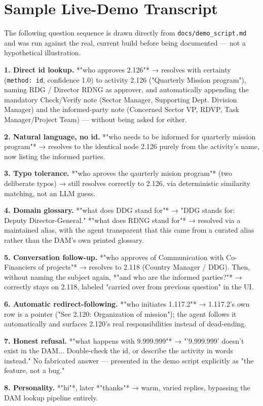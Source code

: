 \chapter{Sample Live-Demo Transcript}
\label{ch:sample-live-demo-transcript}
The following question sequence is drawn directly from \texttt{docs/\allowbreak{}demo\_\allowbreak{}script.md} and was run against the real, current build before being documented — not a hypothetical illustration.

\textbf{1. Direct id lookup.} *"who approves 2.126"* → resolves with certainty (\texttt{method: id}, confidence 1.0) to activity 2.126 ("Quarterly Mission program"), naming RDG / Director RDNG as approver, and automatically appending the mandatory Check/Verify note (Sector Manager, Supporting Dept. Division Manager) and the informed-party note (Concerned Sector VP, RDVP, Task Manager/Project Team) — without being asked for either.

\textbf{2. Natural language, no id.} *"who needs to be informed for quarterly mission program"* → resolves to the identical node 2.126 purely from the activity's name, now listing the informed parties.

\textbf{3. Typo tolerance.} *"who aproves the qaurterly mision program"* (two deliberate typos) → still resolves correctly to 2.126, via deterministic similarity matching, not an LLM guess.

\textbf{4. Domain glossary.} *"what does DDG stand for"* → "DDG stands for: Deputy Director-General." *"what does RDNG stand for"* → resolved via a maintained alias, with the agent transparent that this came from a curated alias rather than the DAM's own printed glossary.

\textbf{5. Conversation follow-up.} *"who approves of Communication with Co-Financiers of projects"* → resolves to 2.118 (Country Manager / DDG). Then, without naming the subject again, *"and who are the informed parties?"* → correctly stays on 2.118, labeled "carried over from previous question" in the UI.

\textbf{6. Automatic redirect-following.} *"who initiates 1.117.2"* → 1.117.2's own row is a pointer ("See 2.120: Organization of mission"); the agent follows it automatically and surfaces 2.120's real responsibilities instead of dead-ending.

\textbf{7. Honest refusal.} *"what happens with 9.999.999"* → "'9.999.999' doesn't exist in the DAM... Double-check the id, or describe the activity in words instead." No fabricated answer — presented in the demo script explicitly as "the feature, not a bug."

\textbf{8. Personality.} *"hi"*, later *"thanks"* → warm, varied replies, bypassing the DAM lookup pipeline entirely.

